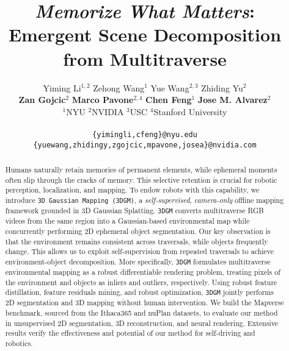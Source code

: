 \documentclass{article}
\title{\textit{Memorize What Matters}: \\Emergent Scene Decomposition from Multitraverse}
\author{Yiming Li$^{1,2}$ \quad  Zehong Wang$^{1}$ \quad  Yue Wang$^{2,3}$ \quad Zhiding Yu$^{2}$ \\ \textbf{Zan Gojcic$^{2}$} \quad \textbf{Marco Pavone$^{2,4}$} \quad \textbf{Chen Feng$^{1}$} \quad \textbf{Jose M. Alvarez$^{2}$}
\\
$^{1}$NYU \quad $^{2}$NVIDIA \quad $^{3}$USC \quad $^{4}$Stanford University\\
\\
\texttt{\{yimingli,cfeng\}@nyu.edu} \\
\texttt{\{yuewang,zhidingy,zgojcic,mpavone,josea\}@nvidia.com}
}
\begin{document}
\maketitle

\begin{abstract}
Humans naturally retain memories of permanent elements, while ephemeral moments often slip through the cracks of memory. This selective retention is crucial for robotic perception, localization, and mapping. To endow robots with this capability, we introduce \texttt{3D Gaussian Mapping (3DGM)}, a \textit{self-supervised}, \textit{camera-only} offline mapping framework grounded in 3D Gaussian Splatting. \texttt{3DGM} converts multitraverse RGB videos from the same region into a Gaussian-based environmental map while concurrently performing 2D ephemeral object segmentation. Our key observation is that the environment remains consistent across traversals, while objects frequently change. This allows us to exploit self-supervision from repeated traversals to achieve environment-object decomposition. More specifically, \texttt{3DGM} formulates multitraverse environmental mapping as a robust differentiable rendering problem, treating pixels of the environment and objects as inliers and outliers, respectively. Using robust feature distillation, feature residuals mining, and robust optimization, \texttt{3DGM} jointly performs 2D segmentation and 3D mapping without human intervention. We build the Mapverse benchmark, sourced from the Ithaca365 and nuPlan datasets, to evaluate our method in unsupervised 2D segmentation, 3D reconstruction, and neural rendering. Extensive results verify the effectiveness and potential of our method for self-driving and robotics.

\end{abstract}












\end{document}
